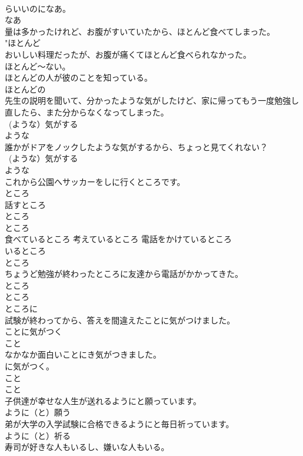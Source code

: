 \documentclass[8pt]{extreport}
\begin{document}
\begin{CJK}{UTF8}{min}
{\\	らいいのになあ。 
\\	なあ 
\\	量は多かったけれど、お腹がすいていたから、ほとんど食べてしまった。	
\\	"ほとんど　
\\	おいしい料理だったが、お腹が痛くてほとんど食べられなかった。	
\\	ほとんど〜ない。 
\\	ほとんどの人が彼のことを知っている。	
\\	ほとんどの 
\\	先生の説明を聞いて、分かったような気がしたけど、家に帰ってもう一度勉強し直したら、また分からなくなってしまった。	
\\	~(ような）気がする 
\\	ような 
\\	誰かがドアをノックしたような気がするから、ちょっと見てくれない？	
\\	~(ような）気がする 
\\	ような 
\\	これから公園へサッカーをしに行くところです。	
\\	ところ 
\\	話すところ	
\\	ところ 
\\	ところ 
\\	食べているところ 考えているところ 電話をかけているところ	
\\	いるところ 
\\	ところ 
\\	ちょうど勉強が終わったところに友達から電話がかかってきた。	
\\	ところ 
\\	ところ 
\\	ところに 
\\	試験が終わってから、答えを間違えたことに気がつけました。	
\\	ことに気がつく 
\\	こと 
\\	なかなか面白いことにき気がつきました。	
\\	に気がつく。 
\\	こと 
\\	こと 
\\	子供達が幸せな人生が送れるようにと願っています。	
\\	ように（と）願う 
\\	弟が大学の入学試験に合格できるようにと毎日祈っています。	
\\	ように（と）祈る 
\\	寿司が好きな人もいるし、嫌いな人もいる。	
}
\end{CJK}
\end{document}
